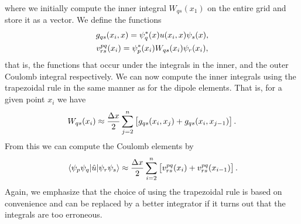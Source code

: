         where we initially compute the inner integral $W_{qs}(x_1)$ on the
        entire grid and store it as a vector.
        We define the functions
        \begin{gather}
            g_{qs}(x_i, x) = \psi^{*}_{q}(x) u(x_i, x) \psi_s(x),
            \\
            v^{pq}_{rs}(x_i)
            = \psi^{*}_{p}(x_i) W_{qs}(x_i) \psi_{r}(x_i),
        \end{gather}
        that is, the functions that occur under the integrals in the inner, and
        the outer Coulomb integral respectively.
        We can now compute the inner integrals using the trapezoidal rule in the
        same manner as for the dipole elements.
        That is, for a given point $x_i$ we have
        \begin{align}
            W_{qs}(x_i)
            \approx \frac{\Delta x}{2}
            \sum_{j = 2}^{n}
            \left[ 
                g_{qs}(x_i, x_j) + g_{qs}(x_i, x_{j - 1})
             \right].
        \end{align}
        From this we can compute the Coulomb elements by
        \begin{align}
            \mel*{\psi_{p}\psi_{q}}{\hat{u}}{\psi_{r}\psi_{s}}
            \approx
            \frac{\Delta x}{2}
            \sum_{i = 2}^{n}
            \left[ 
                v^{pq}_{rs}(x_i) + v^{pq}_{rs}(x_{i - 1})
             \right].
        \end{align}
        Again, we emphasize that the choice of using the trapezoidal rule is
        based on convenience and can be replaced by a better integrator if it
        turns out that the integrals are too erroneous.


